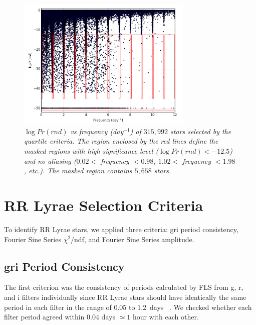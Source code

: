 \documentclass[aps,prb,twocolumn,superscriptaddress]{revtex4-1}
\begin{document}
\begin{figure}[H]
 \centering
 	\includegraphics[width=3.3in]{figures/RlogPr.png}
 \caption{\it \small{$\log{Pr(rnd)}$ vs frequency (day$^{-1}$) of $315,992$ stars selected by the quartile criteria. The region enclosed by the red lines define the masked regions with high significance level ($\log{Pr(rnd)} < -12.5$) and no aliasing ($0.02<$ frequency $<0.98$, $1.02<$ frequency $<1.98$, etc.). The masked region contains $5,658$ stars.}} 
 \label{fig:logPr}
\end{figure}




\section{RR Lyrae Selection Criteria}

To identify RR Lyrae stars, we applied three criteria: gri period consistency, Fourier Sine Series $\chi^2/$ndf, and Fourier Sine Series amplitude. 

\subsection{gri Period Consistency}
The first criterion was the consistency of periods calculated by FLS from g, r, and i filters individually since RR Lyrae stars should have identically the same period in each filter in the range of $0.05$ to $1.2$~days ~\citep{Astro}. We checked whether each filter period agreed within $0.04$ days $\simeq 1$ hour with each other. 
\end{document}
